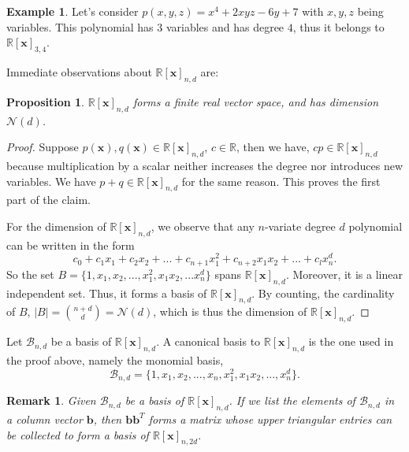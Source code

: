 \documentclass[12pt]{amsart}
\numberwithin{equation}{section}
\newtheorem{prop}[thm]{Proposition}
\newtheorem{remark}[thm]{Remark}
\theoremstyle{definition}
\newtheorem{example}[thm]{Example}
\numberwithin{thm}{section}
\begin{document}
\begin{example}
     Let's consider $p(x, y, z) = x^4 + 2xyz - 6y + 7$ with $x, y, z$ being variables. 
     This polynomial has $3$ variables and has degree $4$, thus it 
     belongs to $\mathbb{R}[\mathbf{x}]_{3, 4}$.
\end{example}

Immediate observations about $\mathbb{R}[\mathbf{x}]_{n, d}$ are:
\begin{prop}
     \label{prop:vs}
     $\mathbb{R}[\mathbf{x}]_{n, d}$ forms a finite real vector space, and has dimension $\mathcal{N}(d)$.
\end{prop}
    
\begin{proof}
     Suppose $p(\mathbf{x}), q(\mathbf{x}) \in \mathbb{R}[\mathbf{x}]_{n, d}$, $c \in \mathbb{R}$, then we have,
     $cp \in \mathbb{R}[\mathbf{x}]_{n, d}$ because multiplication by a scalar neither increases the degree nor introduces new variables.
     We have $p + q \in \mathbb{R}[\mathbf{x}]_{n, d}$ for the same reason. This proves the first part of the claim. 

     For the dimension of $\mathbb{R}[\mathbf{x}]_{n, d}$, we observe that
     any $n$-variate degree $d$ polynomial can be written in the form 
     \begin{equation*}c_0 + c_1 x_1 + c_2 x_2 + ... + c_{n+1} x_1^2 + c_{n+2} x_1 x_2 + ... + c_l x_n^d.
     \end{equation*}
     So the set $B = \{1, x_1, x_2, ..., x_1^2, x_1 x_2, ... x_n^d\}$ spans $\mathbb{R}[\mathbf{x}]_{n, d}$.
     Moreover, it is a linear independent set. Thus, it forms a basis of $\mathbb{R}[\mathbf{x}]_{n, d}$.
     By counting, the cardinality of $B$, $|B| = {n+d \choose d} = \mathcal{N}(d)$, which is thus the dimension of $\mathbb{R}[\mathbf{x}]_{n, d}$.

\end{proof}

Let $\mathcal{B}_{n, d}$ be a basis of $\mathbb{R}[\mathbf{x}]_{n, d}$. 
A canonical basis to $\mathbb{R}[\mathbf{x}]_{n, d}$ is the one used in the proof above, 
namely the monomial basis,
\begin{equation*}
     \mathcal{B}_{n, d} = \{1, x_1, x_2, ..., x_n, x_1 ^ 2, x_1 x_2, ..., x_n^d\}.
\end{equation*}

\begin{remark}
     \label{rem:upgrade}
     Given $\mathcal{B}_{n, d}$ be a basis of $\mathbb{R}[\mathbf{x}]_{n, d}$. 
     If we list the elements of $\mathcal{B}_{n, d}$ in a column vector $\mathbf{b}$, 
     then $\mathbf{b} \mathbf{b}^T$ forms a matrix whose upper triangular
     entries can be collected to form a basis of $\mathbb{R}[\mathbf{x}]_{n, 2d}$.
\end{remark}
\end{document}
